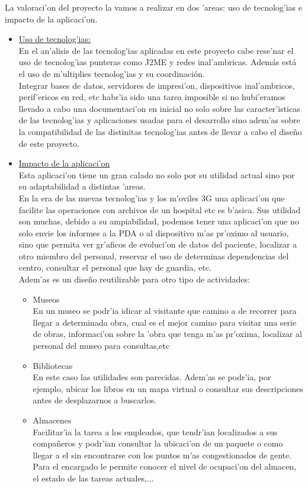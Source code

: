 La valoraci'on del proyecto la vamos a realizar en dos 'areas: uso de tecnolog'ias e impacto de la aplicaci'on.\bigskip \\
\begin{itemize}
\item \underline{Uso de tecnolog'ias:}\bigskip \\
En el an'alisis de las tecnolog'ias aplicadas en este proyecto cabe rese'nar el uso de tecnolog'ias punteras como J2ME y redes inal'ambricas. Además está el uso de m'ultiplies tecnolog'ias y su coordinación. \\Integrar bases de datos, servidores de impresi'on, dispositivos inal'ambricos, perif'ericos en red, etc habr'ia sido una tarea imposible si no hubi'eramos llevado a cabo una documentaci'on en inicial no solo sobre las caracter'isticas de las tecnolog'ias y aplicaciones usadas para el desarrollo sino adem'as sobre la compatibilidad de las distinitas tecnolog'ias antes de llevar a cabo el diseño de este proyecto.
\bigskip \\
\item \underline{Impacto de la aplicaci'on}\bigskip \\
Esta aplicaci'on tiene un gran calado no solo por su utilidad actual sino por su adaptabilidad a distintas 'areas.\\ 
En la era de las nuevas tecnolog'ias y los m'oviles 3G una aplicaci'on que facilite las operaciones con archivos de un hospital etc es b'asica. Sus utilidad son muchas, debido a su ampiabilidad, podemos tener una aplicaci'on que no solo envie los informes a la PDA o al dispositivo m'as pr'oximo al usuario, sino que permita ver gr'aficos de evoluci'on de datos del paciente, localizar a otro miembro del personal, reservar el uso de determinas dependencias del centro, consultar el personal que hay de guardia, etc.\\
Adem'as es un diseño reutilizable para otro tipo de actividades:
\begin{itemize}
\item Museos \bigskip \\
En un museo se podr'ia idicar al visitante que camino a de recorrer para llegar a determinada obra, cual es el mejor camino para visitar una serie de obras, informaci'on sobre la 'obra que tenga m'as pr'oxima, localizar al personal del museo para consultas,etc
\item Bibliotecas\bigskip \\
En este caso las utilidades son parecidas. Adem'as se podr'ia, por ejemplo, ubicar los libros en un mapa virtual o consultar sus descripciones antes de desplazarnos a buscarlos. 
\item Almacenes\bigskip \\
Facilitar'ia la tarea a los empleados, que tendr'ian localizados a sus compañeros y podr'ian consultar la ubicaci'on de un paquete o como llegar a el sin encontrarse con los puntos m'as congestionados de gente. Para el encargado le permite conocer el nivel de ocupaci'on del almacen, el estado de las tareas actuales,...
\end{itemize}


\end{itemize}

